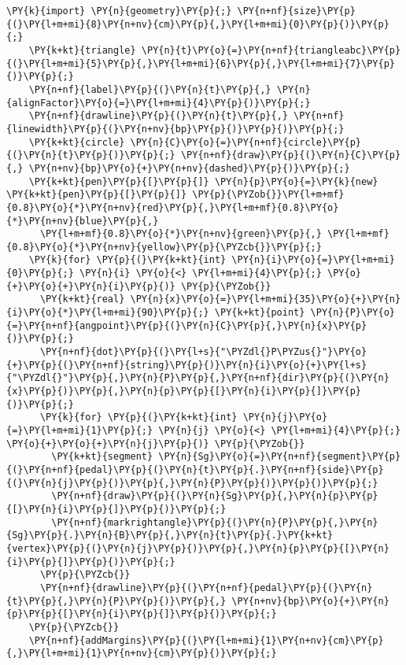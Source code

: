 \begin{Verbatim}[commandchars=\\\{\}]
    \PY{k}{import} \PY{n}{geometry}\PY{p}{;} \PY{n+nf}{size}\PY{p}{(}\PY{l+m+mi}{8}\PY{n+nv}{cm}\PY{p}{,}\PY{l+m+mi}{0}\PY{p}{)}\PY{p}{;}
    \PY{k+kt}{triangle} \PY{n}{t}\PY{o}{=}\PY{n+nf}{triangleabc}\PY{p}{(}\PY{l+m+mi}{5}\PY{p}{,}\PY{l+m+mi}{6}\PY{p}{,}\PY{l+m+mi}{7}\PY{p}{)}\PY{p}{;}
    \PY{n+nf}{label}\PY{p}{(}\PY{n}{t}\PY{p}{,} \PY{n}{alignFactor}\PY{o}{=}\PY{l+m+mi}{4}\PY{p}{)}\PY{p}{;}
    \PY{n+nf}{drawline}\PY{p}{(}\PY{n}{t}\PY{p}{,} \PY{n+nf}{linewidth}\PY{p}{(}\PY{n+nv}{bp}\PY{p}{)}\PY{p}{)}\PY{p}{;}
    \PY{k+kt}{circle} \PY{n}{C}\PY{o}{=}\PY{n+nf}{circle}\PY{p}{(}\PY{n}{t}\PY{p}{)}\PY{p}{;} \PY{n+nf}{draw}\PY{p}{(}\PY{n}{C}\PY{p}{,} \PY{n+nv}{bp}\PY{o}{+}\PY{n+nv}{dashed}\PY{p}{)}\PY{p}{;}
    \PY{k+kt}{pen}\PY{p}{[}\PY{p}{]} \PY{n}{p}\PY{o}{=}\PY{k}{new} \PY{k+kt}{pen}\PY{p}{[}\PY{p}{]} \PY{p}{\PYZob{}}\PY{l+m+mf}{0.8}\PY{o}{*}\PY{n+nv}{red}\PY{p}{,}\PY{l+m+mf}{0.8}\PY{o}{*}\PY{n+nv}{blue}\PY{p}{,}
      \PY{l+m+mf}{0.8}\PY{o}{*}\PY{n+nv}{green}\PY{p}{,} \PY{l+m+mf}{0.8}\PY{o}{*}\PY{n+nv}{yellow}\PY{p}{\PYZcb{}}\PY{p}{;}
    \PY{k}{for} \PY{p}{(}\PY{k+kt}{int} \PY{n}{i}\PY{o}{=}\PY{l+m+mi}{0}\PY{p}{;} \PY{n}{i} \PY{o}{<} \PY{l+m+mi}{4}\PY{p}{;} \PY{o}{+}\PY{o}{+}\PY{n}{i}\PY{p}{)} \PY{p}{\PYZob{}}
      \PY{k+kt}{real} \PY{n}{x}\PY{o}{=}\PY{l+m+mi}{35}\PY{o}{+}\PY{n}{i}\PY{o}{*}\PY{l+m+mi}{90}\PY{p}{;} \PY{k+kt}{point} \PY{n}{P}\PY{o}{=}\PY{n+nf}{angpoint}\PY{p}{(}\PY{n}{C}\PY{p}{,}\PY{n}{x}\PY{p}{)}\PY{p}{;}
      \PY{n+nf}{dot}\PY{p}{(}\PY{l+s}{"\PYZdl{}P\PYZus{}"}\PY{o}{+}\PY{p}{(}\PY{n+nf}{string}\PY{p}{)}\PY{n}{i}\PY{o}{+}\PY{l+s}{"\PYZdl{}"}\PY{p}{,}\PY{n}{P}\PY{p}{,}\PY{n+nf}{dir}\PY{p}{(}\PY{n}{x}\PY{p}{)}\PY{p}{,}\PY{n}{p}\PY{p}{[}\PY{n}{i}\PY{p}{]}\PY{p}{)}\PY{p}{;}
      \PY{k}{for} \PY{p}{(}\PY{k+kt}{int} \PY{n}{j}\PY{o}{=}\PY{l+m+mi}{1}\PY{p}{;} \PY{n}{j} \PY{o}{<} \PY{l+m+mi}{4}\PY{p}{;} \PY{o}{+}\PY{o}{+}\PY{n}{j}\PY{p}{)} \PY{p}{\PYZob{}}
        \PY{k+kt}{segment} \PY{n}{Sg}\PY{o}{=}\PY{n+nf}{segment}\PY{p}{(}\PY{n+nf}{pedal}\PY{p}{(}\PY{n}{t}\PY{p}{.}\PY{n+nf}{side}\PY{p}{(}\PY{n}{j}\PY{p}{)}\PY{p}{,}\PY{n}{P}\PY{p}{)}\PY{p}{)}\PY{p}{;}
        \PY{n+nf}{draw}\PY{p}{(}\PY{n}{Sg}\PY{p}{,}\PY{n}{p}\PY{p}{[}\PY{n}{i}\PY{p}{]}\PY{p}{)}\PY{p}{;}
        \PY{n+nf}{markrightangle}\PY{p}{(}\PY{n}{P}\PY{p}{,}\PY{n}{Sg}\PY{p}{.}\PY{n}{B}\PY{p}{,}\PY{n}{t}\PY{p}{.}\PY{k+kt}{vertex}\PY{p}{(}\PY{n}{j}\PY{p}{)}\PY{p}{,}\PY{n}{p}\PY{p}{[}\PY{n}{i}\PY{p}{]}\PY{p}{)}\PY{p}{;}
      \PY{p}{\PYZcb{}}
      \PY{n+nf}{drawline}\PY{p}{(}\PY{n+nf}{pedal}\PY{p}{(}\PY{n}{t}\PY{p}{,}\PY{n}{P}\PY{p}{)}\PY{p}{,} \PY{n+nv}{bp}\PY{o}{+}\PY{n}{p}\PY{p}{[}\PY{n}{i}\PY{p}{]}\PY{p}{)}\PY{p}{;}
    \PY{p}{\PYZcb{}}
    \PY{n+nf}{addMargins}\PY{p}{(}\PY{l+m+mi}{1}\PY{n+nv}{cm}\PY{p}{,}\PY{l+m+mi}{1}\PY{n+nv}{cm}\PY{p}{)}\PY{p}{;}
\end{Verbatim}
